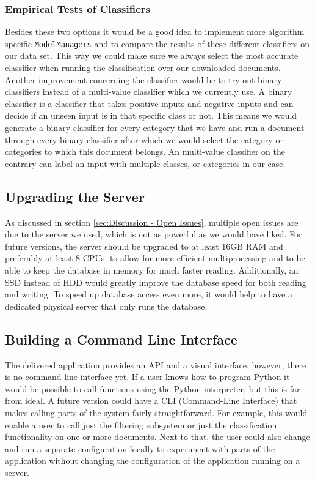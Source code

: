 \subsubsection{Empirical Tests of Classifiers}
Besides these two options it would be a good idea to implement more algorithm specific \texttt{ModelManagers} and to compare the results of these different classifiers on our data set. This way we could make sure we always select the most accurate classifier when running the classification over our downloaded documents.\\
Another improvement concerning the classifier would be to try out binary classifiers instead of a multi-value classifier which we currently use. A binary classifier is a classifier that takes positive inputs and negative inputs and can decide if an unseen input is in that specific class or not. This means we would generate a binary classifier for every category that we have and run a document through every binary classifier after which we would select the category or categories to which this document belongs. An multi-value classifier on the contrary can label an input with multiple classes, or categories in our case\cite{hess2008multi}.  

\subsection{Upgrading the Server}
As discussed in section \ref{sec:Discussion - Open Issues}, multiple open issues are due to the server we used, which is not as powerful as we would have liked. For future versions, the server should be upgraded to at least 16GB RAM and preferably at least 8 CPUs, to allow for more efficient multiprocessing and to be able to keep the database in memory for much faster reading. Additionally, an SSD instead of HDD would greatly improve the database speed for both reading and writing. To speed up database access even more, it would help to have a dedicated physical server that only runs the database.

\subsection{Building a Command Line Interface}
The delivered application provides an API and a visual interface, however, there is no command-line interface yet. If a user knows how to program Python it would be possible to call functions using the Python interpreter, but this is far from ideal. A future version could have a CLI (Command-Line Interface) that makes calling parts of the system fairly straightforward. For example, this would enable a user to call just the filtering subsystem or just the classification functionality on one or more documents. Next to that, the user could also change and run a separate configuration locally to experiment with parts of the application without changing the configuration of the application running on a server.

